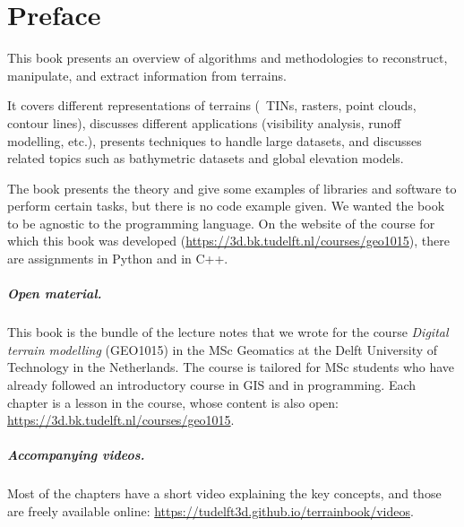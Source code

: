 


\chapter*{Preface}

This book presents an overview of algorithms and methodologies to reconstruct, manipulate, and extract information from terrains.

It covers different representations of terrains (\eg\ TINs, rasters, point clouds, contour lines), discusses different applications (visibility analysis, runoff modelling, etc.), presents techniques to handle large datasets, and discusses related topics such as bathymetric datasets and global elevation models.

The book presents the theory and give some examples of libraries and software to perform certain tasks, but there is no code example given.
We wanted the book to be agnostic to the programming language.
On the website of the course for which this book was developed (\url{https://3d.bk.tudelft.nl/courses/geo1015}), there are assignments in Python and in C++.



\paragraph*{Open material.}
This book is the bundle of the lecture notes that we wrote for the course \emph{Digital terrain modelling} (GEO1015) in the MSc Geomatics at the Delft University of Technology in the Netherlands.
The course is tailored for MSc students who have already followed an introductory course in GIS and in programming.
Each chapter is a lesson in the course, whose content is also open: \url{https://3d.bk.tudelft.nl/courses/geo1015}.


\paragraph*{Accompanying videos.}
Most of the chapters have a short video explaining the key concepts, and those are freely available online: \url{https://tudelft3d.github.io/terrainbook/videos}.


